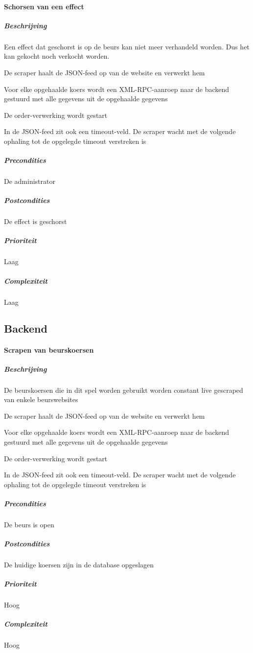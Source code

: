 \paragraph{Schorsen van een effect}
\begin{compact}
\subparagraph{Beschrijving} Een effect dat geschorst is op de beurs kan niet meer verhandeld worden. Dus het kan gekocht noch verkocht worden.
\begin{itemize_compact}
	\item De scraper haalt de JSON-feed op van de website en verwerkt hem
  \item Voor elke opgehaalde koers wordt een XML-RPC-aanroep naar de backend gestuurd met alle gegevens uit de opgehaalde gegevens
  \item De order-verwerking wordt gestart
  \item In de JSON-feed zit ook een timeout-veld. De scraper wacht met de volgende ophaling tot de opgelegde timeout verstreken is
\end{itemize_compact}
\subparagraph{Precondities} De administrator 
\subparagraph{Postcondities} De effect is geschorst
\subparagraph{Prioriteit}Laag
\subparagraph{Complexiteit}Laag
\end{compact}


\subsection{Backend}

\paragraph{Scrapen van beurskoersen}
\begin{compact}
\subparagraph{Beschrijving} De beurskoersen die in dit spel worden gebruikt worden constant live gescraped van enkele beurswebsites
\begin{itemize_compact}
	\item De scraper haalt de JSON-feed op van de website en verwerkt hem
  \item Voor elke opgehaalde koers wordt een XML-RPC-aanroep naar de backend gestuurd met alle gegevens uit de opgehaalde gegevens
  \item De order-verwerking wordt gestart
  \item In de JSON-feed zit ook een timeout-veld. De scraper wacht met de volgende ophaling tot de opgelegde timeout verstreken is
\end{itemize_compact}
\subparagraph{Precondities} De beurs is open
\subparagraph{Postcondities} De huidige koersen zijn in de database opgeslagen
\subparagraph{Prioriteit}Hoog
\subparagraph{Complexiteit}Hoog
\end{compact}

